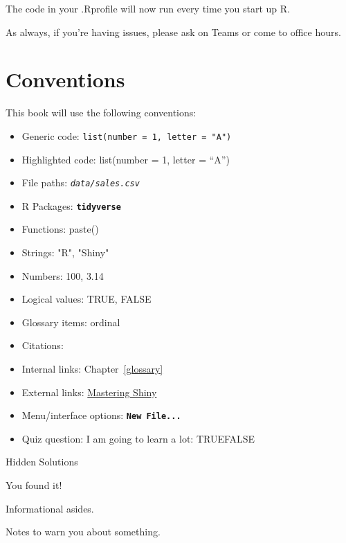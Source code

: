 \documentclass[
  oneside]{book}
\newcommand{\ConstantTok}[1]{\textcolor[rgb]{0.00,0.00,0.00}{#1}}
\newcommand{\DecValTok}[1]{\textcolor[rgb]{0.00,0.00,0.81}{#1}}
\newcommand{\StringTok}[1]{\textcolor[rgb]{0.31,0.60,0.02}{#1}}
\providecommand{\tightlist}{%
  \setlength{\itemsep}{0pt}\setlength{\parskip}{0pt}}
\begin{document}
The code in your .Rprofile will now run every time you start up R.

As always, if you're having issues, please ask on Teams or come to office hours.

\hypertarget{conventions}{%
\chapter{Conventions}\label{conventions}}

This book will use the following conventions:

\begin{itemize}
\tightlist
\item
  Generic code: \texttt{list(number\ =\ 1,\ letter\ =\ "A")}
\item
  Highlighted code: {list}{(}number {=} {1}, letter {=} {``A''}{)}
\item
  File paths: \textit{\texttt{data/sales.csv}}
\item
  R Packages: \textbf{\texttt{tidyverse}}
\item
  Functions: {paste}{(}{)}
\item
  Strings: \StringTok{"R"}, \StringTok{"Shiny"}
\item
  Numbers: \DecValTok{100}, \DecValTok{3.14}
\item
  Logical values: \ConstantTok{TRUE}, \ConstantTok{FALSE}
\item
  Glossary items: ordinal
\item
  Citations: \citet{R-tidyverse}
\item
  Internal links: Chapter~\ref{glossary}
\item
  External links: \href{https://mastering-shiny.org/}{Mastering Shiny}
\item
  Menu/interface options: \textbf{\texttt{New\ File...}}
\item
  Quiz question: I am going to learn a lot: TRUEFALSE
\end{itemize}

Hidden Solutions

You found it!

\begin{info}
Informational asides.

\end{info}

\begin{warning}
Notes to warn you about something.

\end{warning}
\end{document}
